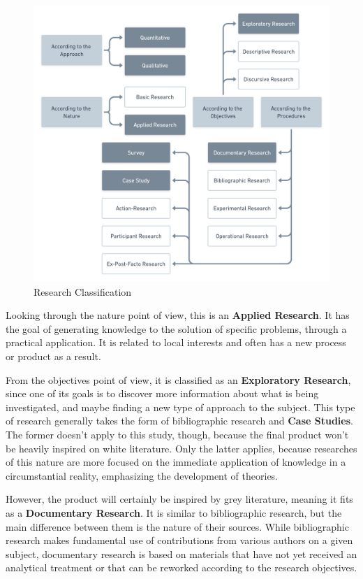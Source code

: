 \begin{figure}[!htb]
  \caption{Research Classification}\label{fig:research-classification}
  \begin{center}
    \includegraphics[width=16cm]{img/2-Research Classification@2x.png}
  \end{center}
\end{figure}

Looking through the nature point of view, this is an \textbf{Applied Research}. It has the goal of generating knowledge to the solution of specific problems, through a practical application. It is related to local interests and often has a new process or product as a result.

From the objectives point of view, it is classified as an \textbf{Exploratory Research}, since one of its goals is to discover more information about what is being investigated, and maybe finding a new type of approach to the subject. This type of research generally takes the form of bibliographic research and \textbf{Case Studies}. The former doesn't apply to this study, though, because the final product won't be heavily inspired on white literature. Only the latter applies, because researches of this nature are more focused on the immediate application of knowledge in a circumstantial reality, emphasizing the development of theories.

However, the product will certainly be inspired by grey literature, meaning it fits as a \textbf{Documentary Research}. It is similar to bibliographic research, but the main difference between them is the nature of their sources. While bibliographic research makes fundamental use of contributions from various authors on a given subject, documentary research is based on materials that have not yet received an analytical treatment or that can be reworked according to the research objectives.

